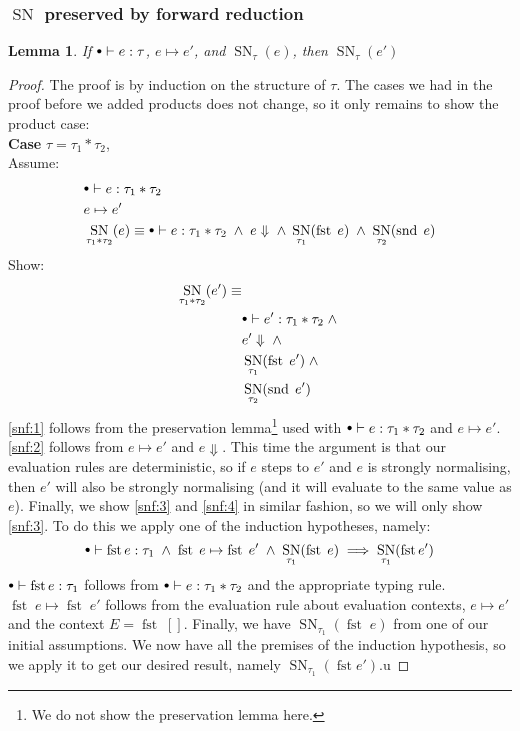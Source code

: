 \documentclass[a4paper,10pt,fleqn]{article}
\DeclareMathOperator{\SNPred}{SN}
\DeclareMathOperator{\fst}{fst}
\DeclareMathOperator{\snd}{snd}
\newcommand{\evalto}{\ensuremath{\mapsto}}
\newcommand{\mtenv}{{\raisebox{1.5pt}{$\scriptstyle\bullet$}}}
\newcommand{\case}[1]{~\\{\bf Case} #1,~\\}
\newcommand{\SN}[2]{\ensuremath{\SNPred_{#1}(#2)}}
\newcommand{\pand}{\ensuremath{\; \wedge \;}}
\newtheorem*{lemma}{Lemma}
\begin{document}
\subsubsection*{$\SNPred$ preserved by forward reduction}
\begin{lemma}
  If $\mtenv \vdash e : \tau$, $e \evalto e'$, and $\SN{\tau}{e}$, then $\SN{\tau}{e'}$
\end{lemma}
\begin{proof}
  The proof is by induction on the structure of $\tau$. The cases we had in the proof before we added products does not change, so it only remains to show the product case:
  \case{$\tau = \tau_1 * \tau_2$}
  Assume:
  \begin{align*}
    & \mtenv \vdash e : \tau_1 * \tau_2 \\
    & e \evalto e' \\
    & \SN{\tau_1*\tau_2}{e} \equiv \mtenv \vdash e : \tau_1 * \tau_2  \pand e \Downarrow \pand \SN{\tau_1}{\fst \; e} \pand \SN{\tau_2}{\snd \; e}
  \end{align*}
  Show:  
  \begin{align}
    \SN{\tau_1*\tau_2}{e'} \equiv & \nonumber \\
                                &\mtenv \vdash e' : \tau_1 * \tau_2  \pand \label{snf:1}\\
                                &e' \Downarrow \pand \label{snf:2}\\
                                &\SN{\tau_1}{\fst \; e'} \pand \label{snf:3} \\
                                &\SN{\tau_2}{\snd \; e'} \label{snf:4}
  \end{align}
  \ref{snf:1} follows from the preservation lemma\footnote{We do not show the preservation lemma here.} used with $\mtenv \vdash e : \tau_1 * \tau_2$ and $e \evalto e'$. \ref{snf:2} follows from $e \evalto e'$ and $e \Downarrow$. This time the argument is that our evaluation rules are deterministic, so if $e$ steps to $e'$ and $e$ is strongly normalising, then $e'$ will also be strongly normalising (and it will evaluate to the same value as $e$). Finally, we show \ref{snf:3} and \ref{snf:4} in similar fashion, so we will only show \ref{snf:3}. To do this we apply one of the induction hypotheses, namely:
\[
  \mtenv \vdash \fst e : \tau_1 \pand \fst \; e \evalto \fst \; e' \pand \SN{\tau_1}{\fst \; e} \implies \SN{\tau_1}{\fst e'}
\]
$\mtenv \vdash \fst e : \tau_1$ follows from $\mtenv \vdash e : \tau_1 * \tau_2$ and the appropriate typing rule. $\fst \; e \evalto \fst \; e'$ follows from the evaluation rule about evaluation contexts, $e \evalto e'$ and the context $E = \fst\; []$. Finally, we have $\SN{\tau_1}{\fst \; e}$ from one of our initial assumptions. We now have all the premises of the induction hypothesis, so we apply it to get our desired result, namely $\SN{\tau_1}{\fst e'}$.u
\end{proof}
\end{document}
